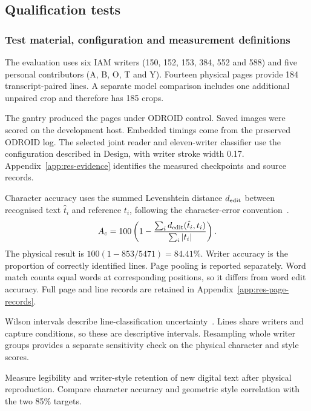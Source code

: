 \subsection{Qualification tests}
\label{sec:res-qtp}
\subsubsection{Test material, configuration and measurement definitions}
\label{sec:res-method}
The evaluation uses six IAM writers (150, 152, 153, 384, 552 and 588) and five personal contributors (A, B, O, T and Y). Fourteen physical pages provide 184 transcript-paired lines. A separate model comparison includes one additional unpaired crop and therefore has 185 crops.

The gantry produced the pages under ODROID control. Saved images were scored on the development host. Embedded timings come from the preserved ODROID log. The selected joint reader and eleven-writer classifier use the configuration described in Design, with writer stroke width 0.17. Appendix~\ref{app:res-evidence} identifies the measured checkpoints and source records.

Character accuracy uses the summed Levenshtein distance $d_{\rm edit}$ between recognised text $\hat t_i$ and reference $t_i$, following the character-error convention~\cite[p.~2]{graves2006}.
\begin{equation}
A_c=100\left(1-\frac{\sum_i d_{\rm edit}(\hat t_i,t_i)}{\sum_i|t_i|}\right).
\label{eq:res-char}
\end{equation}
The physical result is $100(1-853/5471)=84.41\%$. Writer accuracy is the proportion of correctly identified lines. Page pooling is reported separately. Word match counts equal words at corresponding positions, so it differs from word edit accuracy. Full page and line records are retained in Appendix~\ref{app:res-page-records}.

Wilson intervals describe line-classification uncertainty~\cite[pp.~209--212]{wilson1927}. Lines share writers and capture conditions, so these are descriptive intervals. Resampling whole writer groups provides a separate sensitivity check on the physical character and style scores.

Measure legibility and writer-style retention of new digital text after physical reproduction. Compare character accuracy and geometric style correlation with the two 85\% targets.

